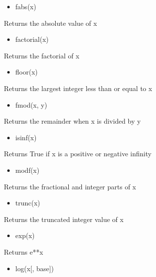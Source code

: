\documentclass[11pt]{article}
\providecommand{\tightlist}{%
      \setlength{\itemsep}{0pt}\setlength{\parskip}{0pt}}
\begin{document}
\begin{itemize}
\tightlist
\item
  fabs(x)
\end{itemize}

Returns the absolute value of x

\begin{itemize}
\tightlist
\item
  factorial(x)
\end{itemize}

Returns the factorial of x

\begin{itemize}
\tightlist
\item
  floor(x)
\end{itemize}

Returns the largest integer less than or equal to x

\begin{itemize}
\tightlist
\item
  fmod(x, y)
\end{itemize}

Returns the remainder when x is divided by y

\begin{itemize}
\tightlist
\item
  isinf(x)
\end{itemize}

Returns True if x is a positive or negative infinity

\begin{itemize}
\tightlist
\item
  modf(x)
\end{itemize}

Returns the fractional and integer parts of x

\begin{itemize}
\tightlist
\item
  trunc(x)
\end{itemize}

Returns the truncated integer value of x

\begin{itemize}
\tightlist
\item
  exp(x)
\end{itemize}

Returns e**x

\begin{itemize}
\tightlist
\item
  log(x{[}, base{]})
\end{itemize}
\end{document}
